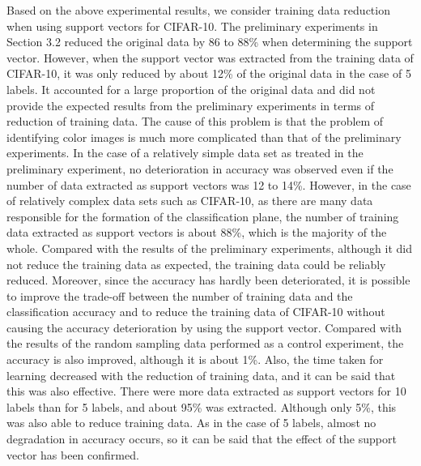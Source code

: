 Based on the above experimental results, we consider training data reduction when using support vectors for CIFAR-10. The preliminary experiments in Section 3.2 reduced the original data by 86 to 88\% when determining the support vector. However, when the support vector was extracted from the training data of CIFAR-10, it was only reduced by about 12\% of the original data in the case of 5 labels. It accounted for a large proportion of the original data and did not provide the expected results from the preliminary experiments in terms of reduction of training data. The cause of this problem is that the problem of identifying color images is much more complicated than that of the preliminary experiments. In the case of a relatively simple data set as treated in the preliminary experiment, no deterioration in accuracy was observed even if the number of data extracted as support vectors was 12 to 14\%. However, in the case of relatively complex data sets such as CIFAR-10, as there are many data responsible for the formation of the classification plane, the number of training data extracted as support vectors is about 88\%, which is the majority of the whole. Compared with the results of the preliminary experiments, although it did not reduce the training data as expected, the training data could be reliably reduced. Moreover, since the accuracy has hardly been deteriorated, it is possible to improve the trade-off between the number of training data and the classification accuracy and to reduce the training data of CIFAR-10 without causing the accuracy deterioration by using the support vector. Compared with the results of the random sampling data performed as a control experiment, the accuracy is also improved, although it is about 1\%. Also, the time taken for learning decreased with the reduction of training data, and it can be said that this was also effective. There were more data extracted as support vectors for 10 labels than for 5 labels, and about 95\% was extracted. Although only 5\%, this was also able to reduce training data. As in the case of 5 labels, almost no degradation in accuracy occurs, so it can be said that the effect of the support vector has been confirmed.

